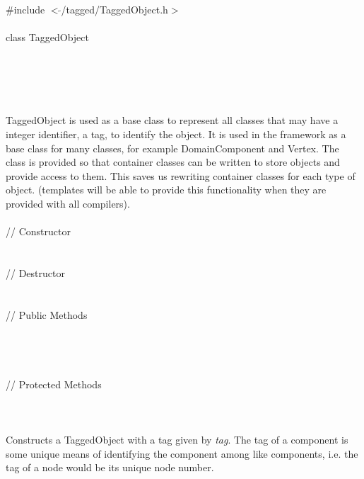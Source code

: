 
   \\
\indent \#include $<\tilde{ }$/tagged/TaggedObject.h$>$ \\

  \\
\indent class TaggedObject  \\

 \\
 \\
\indent{} \\
\indent{} \\

  \\
\indent TaggedObject is used as a base class to represent all classes
that may have a integer identifier, a tag, to identify the object. It
is used in the framework as a base class for many classes, for example
DomainComponent and Vertex. The class is provided so that container
classes can be written to store objects and provide access to
them. This saves us rewriting container classes for each type of 
object. (templates will be able to provide this functionality when
they are provided with all compilers). \\ 

  \\
\indent // Constructor  \\
  \\ \\
\indent // Destructor  \\
  \\ \\
\indent // Public Methods  \\
 \\ 
 \\
 \\  \\ 
\indent // Protected Methods  \\
 \\

  \\
  \\
Constructs a TaggedObject with a tag given by {\em tag}. The tag of
a component is some unique means of identifying the component among
like components, i.e. the tag of a node would be its unique node number. \\


